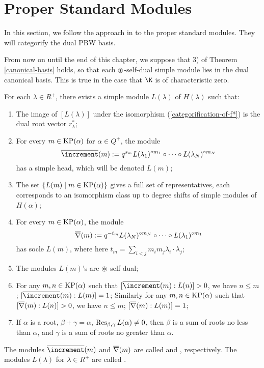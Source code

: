 \section{Proper Standard Modules}

In this section, we follow the approach in \cite{Mc} to the proper standard modules. They will
categorify the dual PBW basis.

From now on until the end of this chapter, we suppose that 3) of
Theorem \ref{canonical-basis} holds,
so that each $\circledast$-self-dual simple module lies in the dual canonical basis.
This is true in the case that $\K$ is of characteristic zero.

\begin{theorem}[{\cite[Theorems 3.1, 3.2]{Mc}}]\label{proper-standard-modules}
    For each $\lambda\in R^+$, there exists a simple module $L(\lambda)$
    of $H(\lambda)$ such that:
    \begin{enumerate}[1)]
        \item The image of $[L(\lambda)]$ under the isomorphism
        (\ref{categorification-of-f*}) is the dual root vector $r_\lambda^*$;
        \item For every $m\in\operatorname{KP}(\alpha)$ for $\alpha\in Q^+$, the module
        \[
            \pstd(m) := q^{s_m}L(\lambda_1)^{\circ m_1}\circ\cdots
            \circ L(\lambda_N)^{\circ m_N}
        \] 
        has a simple head,
        which will be denoted $L(m)$;
        \item The set $\{L(m)\mid m\in\operatorname{KP}(\alpha)\}$
        gives a full set of representatives, each corresponds to an isomorphism class
        up to degree shifts of simple modules of $H(\alpha)$;
        \item For every $m\in\operatorname{KP}(\alpha)$, the module
        \[
            \overline{\nabla}(m) := q^{-t_m}L(\lambda_N)^{\circ m_N}\circ\cdots
            \circ L(\lambda_1)^{\circ m_1}
        \]    
        has socle $L(m)$,
        where here $t_m = \sum_{i<j}m_im_j\lambda_i\cdot\lambda_j$;
        \item The modules $L(m)$'s are $\circledast$-self-dual;
        \item For any $m,n\in\operatorname{KP}(\alpha)$ such that $[\pstd(m):L(n)]>0$, 
        we have $n\le m$; $[\pstd(m):L(m)] = 1$; Similarly
        for any $m,n\in\operatorname{KP}(\alpha)$ such that $[\overline{\nabla}(m):L(n)]>0$, 
        we have $n\le m$; $[\overline{\nabla}(m):L(m)] = 1$;
        \item If $\alpha$ is a root, $\beta+\gamma = \alpha$,
        $\operatorname{Res}_{\beta,\gamma}L(\alpha)\ne 0$, then $\beta$ is a sum of roots
        no less than $\alpha$, and $\gamma$ is a sum of roots no greater than
        $\alpha$.
    \end{enumerate}
    The modules $\pstd(m)$ and $\overline{\nabla}(m)$ are called 
     and ,
    respectively. The modules $L(\lambda)$ for $\lambda\in R^+$
    are called .
\end{theorem}

